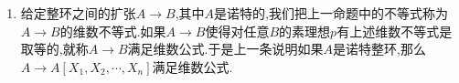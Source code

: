 \begin{enumerate}
\begin{proof}
		\qquad
		
		如果$\mathfrak{Q}\not=(0)$,那么$B$是在$A$上添加了一个代数元,于是$\mathrm{tr.deg}_AB=0$.因为$A\subseteq B=A[X]/\mathfrak{Q}$是单同态,所以在$A[X]$中有$A\cap\mathfrak{Q}=(0)$.记$K=\mathrm{Frac}(A)$,那么$\mathrm{ht}(\mathfrak{Q})=\mathrm{ht}(\mathfrak{Q}K[X])=1$.如果记$\mathfrak{P}'\subseteq A[X]$是$\mathfrak{P}$在$A[X]$中的原像,那么$\mathfrak{P}=\mathfrak{P}'/\mathfrak{Q}$和$\kappa(\mathfrak{P})=\kappa(\mathfrak{P}')$.结合$\mathfrak{Q}=(0)$情况我们已经证明了,就有:
		\begin{align*}
			\mathrm{ht}(\mathfrak{P})&\le\mathrm{ht}(\mathfrak{P}')-\mathrm{ht}(\mathfrak{Q})\\&=\mathrm{ht}(\mathfrak{P}')-1\\&=\left(\mathrm{ht}(\mathfrak{p})+\mathrm{tr.deg}_A(A[X])-\mathrm{tr.deg}_{\kappa(\mathfrak{p})}\kappa(\mathfrak{P}')\right)-1\\&=\mathrm{ht}(\mathfrak{p})-\mathrm{tr.deg}_{\kappa(\mathfrak{p})}(\kappa(\mathfrak{P}))
		\end{align*}
	\end{proof}
    \item 给定整环之间的扩张$A\to B$,其中$A$是诺特的,我们把上一命题中的不等式称为$A\to B$的维数不等式.如果$A\to B$使得对任意$B$的素理想$p$有上述维数不等式是取等的,就称$A\to B$满足维数公式.于是上一条说明如果$A$是诺特整环,那么$A\to A[X_1,X_2,\cdots,X_n]$满足维数公式.
\end{enumerate}

